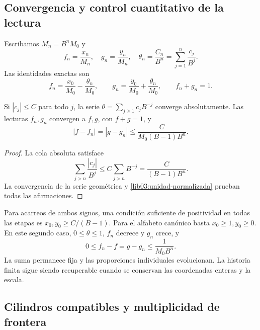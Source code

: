 \subsection{Convergencia y control cuantitativo de la lectura}
\label{lib03:limite}

Escribamos \(M_n=B^nM_0\) y
\begin{equation}
 f_n=\frac{x_n}{M_n},\quad g_n=\frac{y_n}{M_n},\quad
 \theta_n=\frac{C_n}{B^n}=\sum_{j=1}^n\frac{c_j}{B^j}.
 \label{lib03:lecturas-normalizadas}
\end{equation}
Las identidades exactas son
\begin{equation}
 f_n=\frac{x_0}{M_0}-\frac{\theta_n}{M_0},\qquad
 g_n=\frac{y_0}{M_0}+\frac{\theta_n}{M_0},\qquad f_n+g_n=1.
 \label{lib03:unidad-normalizada}
\end{equation}

\begin{theorem}
\label{lib03:teo-limite}
Si \(|c_j|\leq C\) para todo \(j\), la serie
\(\theta=\sum_{j\geq1}c_jB^{-j}\) converge absolutamente. Las
lecturas \(f_n,g_n\) convergen a \(f,g\), con \(f+g=1\), y
\begin{equation}
 |f-f_n|=|g-g_n|\leq\frac{C}{M_0(B-1)B^n}.
 \label{lib03:cota-cola}
\end{equation}
\end{theorem}

\begin{proof}
La cola absoluta satisface
\[
 \sum_{j>n}\frac{|c_j|}{B^j}
 \leq C\sum_{j>n}B^{-j}=\frac{C}{(B-1)B^n}.
\]
La convergencia de la serie geométrica y
\eqref{lib03:unidad-normalizada} prueban todas las afirmaciones.
\end{proof}

Para acarreos de ambos signos, una condición suficiente de positividad
en todas las etapas es \(x_0,y_0\geq C/(B-1)\). Para el alfabeto
canónico basta \(x_0\geq1,y_0\geq0\). En este segundo caso,
\(0\leq\theta\leq1\), \(f_n\) decrece y \(g_n\) crece, y
\begin{equation}
 0\leq f_n-f=g-g_n\leq\frac1{M_0B^n}.
 \label{lib03:cota-canonica}
\end{equation}
La suma permanece fija y las proporciones individuales evolucionan.
La historia finita sigue siendo recuperable cuando se conservan las
coordenadas enteras y la escala.

\subsection{Cilindros compatibles y multiplicidad de frontera}
\label{lib03:cilindros}

